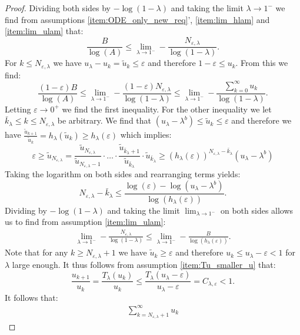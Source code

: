 \documentclass[12pt]{report}
\begin{document}
\begin{proof}
	Dividing both sides by $-\log(1-\lambda)$ and taking the limit $\lambda \rightarrow 1^-$ we find from assumptions \ref{item:ODE_only_new_req}', \ref{item:lim_hlam} and \ref{item:lim_ulam} that:
	$$
	\frac{B}{\log(A)} \leq \lim_{\lambda \rightarrow 1^-} -\frac{N_{\varepsilon,\lambda}}{\log(1-\lambda)}.
	$$ 
	For $k\leq N_{\varepsilon, \lambda}$ we have $u_\lambda - u_k = \tilde u_k \leq \varepsilon$ and therefore $1-\varepsilon \leq u_k$. From this we find:
	$$
	\frac{(1-\varepsilon)B}{\log(A)} \leq \lim_{\lambda \rightarrow 1^-} -\frac{(1-\varepsilon) N_{\varepsilon, \lambda}}{\log(1-\lambda)} \leq \lim_{\lambda \rightarrow 1^-} - \frac{\sum_{k=0}^\infty u_k}{\log(1-\lambda)}.
	$$
	Letting $\varepsilon \rightarrow 0^+$ we find the first inequality. For the other inequality we let $\bar k_\lambda \leq k \leq N_{\varepsilon, \lambda}$ be arbitrary. We find that $
	(u_\lambda - \lambda^b) \leq \tilde{u}_k \leq \varepsilon$ and therefore we have $\frac{\tilde{u}_{k+1}}{\tilde u_k} = h_{\lambda}(\tilde{u}_k) \geq h_{\lambda} (\varepsilon)$ which implies:
	$$
	\varepsilon \geq \tilde u_{N_{\varepsilon,\lambda}} = \frac{\tilde u_{N_{\varepsilon,\lambda}}}{\tilde u_{N_{\varepsilon,\lambda}-1}} \cdot \ldots \cdot \frac{\tilde u_{\bar k_\lambda+1}}{\tilde u_{\bar k_\lambda}} \cdot \tilde u_{\bar k_\lambda} \geq (h_\lambda(\varepsilon))^{N_{\varepsilon, \lambda}-\bar k_\lambda} (u_{\lambda}-\lambda^b)
	$$
	Taking the logarithm on both sides and rearranging terms yields:
	$$
	N_{\varepsilon, \lambda} - \bar k_\lambda \leq \frac{\log(\varepsilon) - \log(u_{\lambda} - \lambda^b)}{\log(h_{\lambda}(\varepsilon))}.
	$$
	Dividing by $-\log(1-\lambda)$ and taking the limit $\lim_{\lambda \rightarrow 1^-}$ on both sides allows us to find from assumption \ref{item:lim_ulam}:
	\begin{align}\label{eq:fromf}
		\lim_{\lambda \rightarrow 1^-} - \frac{N_{\varepsilon,\lambda}}{\log(1-\lambda)}
		\leq 
		\lim_{\lambda \rightarrow 1^-} -\frac{B}{\log(h_\lambda(\varepsilon))}.
	\end{align}
	Note that for any $k \geq N_{\varepsilon,\lambda} + 1$ we have $\tilde u_k \geq \varepsilon$ and therefore $u_k \leq u_\lambda -\varepsilon < 1$ for $\lambda$ large enough. It thus follows from assumption \ref{item:Tu_smaller_u} that:
	$$
	\frac{u_{k+1}}{u_k} = \frac{T_\lambda(u_{k})}{u_k}  \leq \frac{T_\lambda(u_\lambda - \varepsilon)}{u_\lambda - \varepsilon} = C_{\lambda,\varepsilon} < 1.
	$$
	It follows that:
	\begin{align*}
		\sum_{k=N_{\varepsilon,\lambda} + 1}^\infty  u_k 

\end{align*}
\end{proof}
\end{document}
